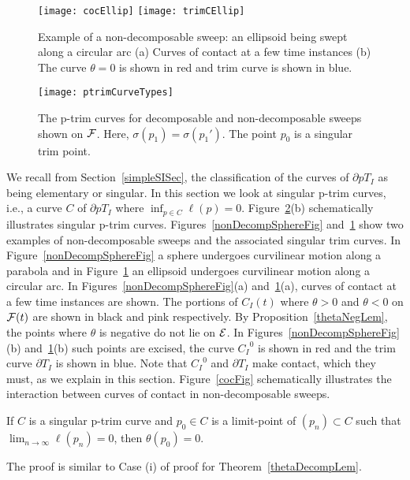\documentclass{elsart5p}
\begin{document}
\begin{figure}
 \centering
 \texttt{[image: cocEllip]}
 \texttt{[image: trimCEllip]}
  \caption{Example of a non-decomposable sweep: an ellipsoid being swept along a circular arc (a) Curves of contact at a few time instances (b) The curve $\theta = 0$ is shown in red and trim curve is shown in blue.}
 \label{nonDecompEllipseFig}
\end{figure}

\begin{figure}
 \centering
 \texttt{[image: ptrimCurveTypes]}
 \caption{The p-trim curves for decomposable and non-decomposable sweeps shown on ${\cal F}$.  Here, 
$\sigma(p_1) = \sigma(p_1')$. The point $p_0$ is a singular trim point.}
 \label{ptrimCurveFig}
\end{figure}

We recall from Section~\ref{simpleSISec}, the classification
of the curves of $\partial pT_I$ as being elementary or singular. In this
section we look at singular p-trim curves, i.e., a curve $C$ of $\partial pT_I$
where $\displaystyle \inf_{p\in C}  \ell(p) =0$.
Figure~\ref{ptrimCurveFig}(b) schematically illustrates singular p-trim curves.
Figures~\ref{nonDecompSphereFig} and~\ref{nonDecompEllipseFig} show two 
examples of non-decomposable sweeps and the associated singular trim curves.
In Figure~\ref{nonDecompSphereFig} a sphere undergoes curvilinear motion 
along a parabola and in Figure~\ref{nonDecompEllipseFig} an ellipsoid undergoes 
curvilinear motion along a circular arc.  In Figures~\ref{nonDecompSphereFig}(a) 
and~\ref{nonDecompEllipseFig}(a), curves of 
contact at a few time instances are shown. The portions of $C_I(t)$ where $\theta >0$ 
and $\theta < 0$ on ${\cal F}(t)$ are shown in black and pink respectively.  
By Proposition~\ref{thetaNegLem}, the points where $\theta$ is negative do not lie on ${\cal E}$. 
In Figures~\ref{nonDecompSphereFig}(b) and~\ref{nonDecompEllipseFig}(b) such points are excised,  
the curve ${C_I }^0$ is shown in red and the trim curve $\partial T_I$ is 
shown in blue.  Note that ${C_I }^0$ and $\partial T_I$ make contact, which 
they must, as we explain in this 
section.  Figure~\ref{cocFig} schematically illustrates the interaction between curves of contact in 
non-decomposable sweeps.  

\begin{prop} \label{singTrimCLem}
If $C$ is a singular p-trim curve and $p_0 \in  C$ is a limit-point of
$(p_n) \subset C$ such that $\displaystyle \lim_{n \to \infty} \ell (p_n)=0$, then $\theta (p_0)=0$.
\end{prop}
The proof is similar to Case (i) of proof for Theorem~\ref{thetaDecompLem}.
\end{document}
